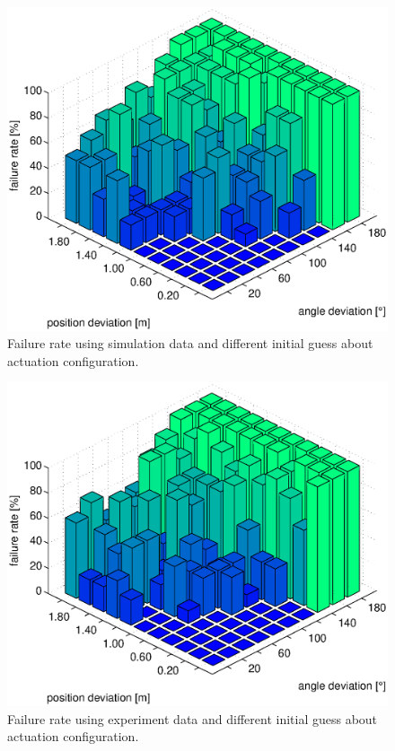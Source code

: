 \begin{figure}[hbtp]
\centering
\includegraphics[width = \textwidth]{images/results/convergence_analysis_init_deviation_sim_bar.eps}
\caption{Failure rate using simulation data and different initial guess about actuation configuration.}
\label{fig:result_sim_convergece_region}
\end{figure}
\begin{figure}[hbtp]
\centering
\includegraphics[width = \textwidth]{images/results/convergence_analysis_init_deviation_real_bar.eps}
\caption{Failure rate using experiment data and different initial guess about actuation configuration.}
\label{fig:result_real_convergece_region}
\end{figure}


